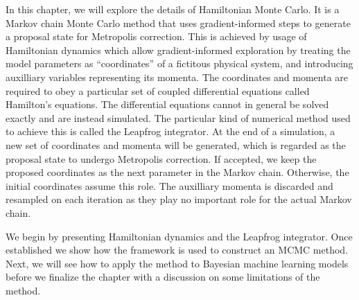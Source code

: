 In this chapter, we will explore the details of Hamiltonian Monte Carlo. It is a Markov chain Monte Carlo method that uses gradient-informed
steps to generate a proposal state for Metropolis correction. This is achieved by usage of Hamiltonian dynamics
which allow gradient-informed exploration by treating the model parameters
as ``coordinates'' of a fictitous physical system, and introducing auxilliary variables representing its momenta. 
The coordinates and momenta are required to obey a particular set of coupled differential equations called Hamilton's equations.
The differential equations cannot in general be solved exactly and are instead simulated. 
The particular kind of numerical method used to achieve this
is called the Leapfrog integrator. At the end of a simulation, a new set of coordinates and momenta 
will be generated,
which is regarded as the proposal state to undergo Metropolis correction.
If accepted, we keep the proposed coordinates as the next parameter in the Markov chain. Otherwise, the initial coordinates
assume this role. The auxilliary momenta is discarded and resampled on each iteration as they play no important role for the actual Markov chain.

We begin by presenting Hamiltonian dynamics and the Leapfrog integrator.
Once established we show how the framework is used to construct an MCMC method.
Next, we will see how to apply the method to Bayesian machine learning models before we finalize the
chapter with a discussion on some limitations of the method.



